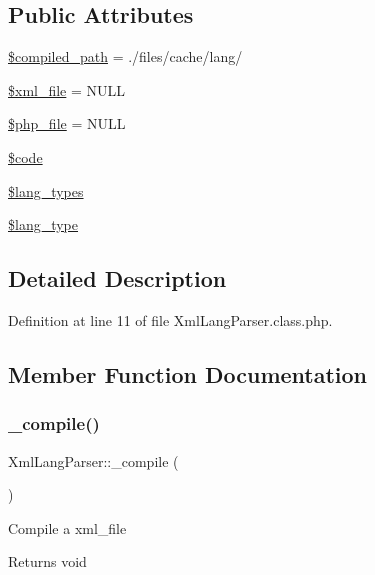 \subsection*{Public Attributes}
\begin{DoxyCompactItemize}
\item 
\hyperlink{classXmlLangParser_af56d412775229f27848e533873fe94f3}{\$compiled\+\_\+path} = \textquotesingle{}./files/cache/lang/\textquotesingle{}
\item 
\hyperlink{classXmlLangParser_a95de36282488ee37a0ef18ef85a6697c}{\$xml\+\_\+file} = N\+U\+LL
\item 
\hyperlink{classXmlLangParser_a0f8639ef765df04b8c4e7903de4353bb}{\$php\+\_\+file} = N\+U\+LL
\item 
\hyperlink{classXmlLangParser_af558c0725662b56f7201d5c0cf9b7761}{\$code}
\item 
\hyperlink{classXmlLangParser_a0385e815b92b65f3b3d12a29e54d1e36}{\$lang\+\_\+types}
\item 
\hyperlink{classXmlLangParser_ac1289e1d349c8e40ef4afd26941cba5d}{\$lang\+\_\+type}
\end{DoxyCompactItemize}


\subsection{Detailed Description}


Definition at line 11 of file Xml\+Lang\+Parser.\+class.\+php.



\subsection{Member Function Documentation}
\mbox{\label{classXmlLangParser_a6a27a9fbdd65d3ea3249120f8eb7d9c2}} 
\subsubsection{\texorpdfstring{\+\_\+compile()}{\_compile()}}
{\footnotesize\ttfamily Xml\+Lang\+Parser\+::\+\_\+compile (\begin{DoxyParamCaption}{ }\end{DoxyParamCaption})}

Compile a xml\+\_\+file \begin{DoxyReturn}{Returns}
void 
\end{DoxyReturn}


